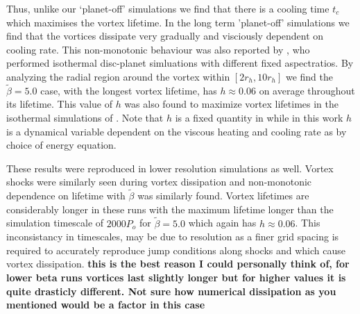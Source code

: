 Thus, unlike our `planet-off' simulations we find that there is
a cooling time $t_c$ which maximises the vortex lifetime. In the long term
 'planet-off' simulations we find that the vortices dissipate very gradually
 and visciously dependent on cooling rate.
This
non-monotonic behaviour was also reported by \cite{fu14}, who
performed isothermal disc-planet simluations with different fixed
aspectratios.   
By analyzing the radial region around the vortex within
 $[2r_{h},10r_{h}]$
 we find the
$\tilde\beta=5.0$ case, with the longest vortex lifetime, has
$h\approx0.06$ on average throughout its lifetime. This value of $h$ was also
 found to maximize vortex
lifetimes in the isothermal simulations of \cite{fu14}. Note that $h$ is a fixed
quantity in \cite{fu14} while in this work $h$ is a dynamical variable dependent
 on the viscous heating and cooling rate as by choice of energy equation.

These results were reproduced in lower resolution simulations as well. Vortex
shocks were similarly seen during vortex dissipation and non-monotonic
 dependence on lifetime with $\tilde\beta$ was similarly found.
Vortex lifetimes are considerably longer in these runs with the maximum
 lifetime longer than the simulation timescale of $2000P_o$ for 
$\tilde\beta=5.0$ which again has $h\approx0.06$.
This inconsistancy in timescales, may be due to resolution as a finer 
grid spacing is required to accurately
reproduce jump conditions along shocks and which cause vortex dissipation.
 {\bf this is the best reason I could personally think of, for lower
   beta runs vortices last slightly longer but for higher values it is
   quite drasticly different. Not sure how numerical dissipation as
   you mentioned would be a factor in this case} 



